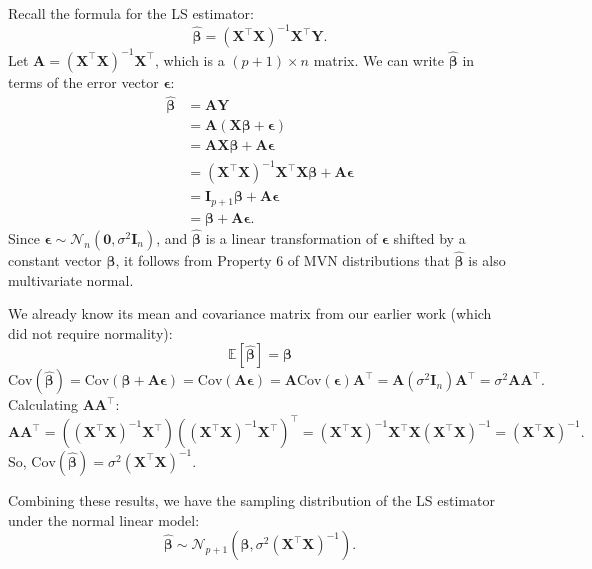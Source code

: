 \documentclass[11pt, letterpaper]{article}
\theoremstyle{plain} %
\theoremstyle{definition} %
\theoremstyle{remark} %
\renewcommand{\mathbf}{\boldsymbol} %
\newcommand{\E}{\mathbb{E}}
\newcommand{\Cov}{\mathrm{Cov}} %
\newcommand{\Normal}{\mathcal{N}}
\newcommand{\I}{\mathbf{I}} %
\begin{document}
Recall the formula for the LS estimator:
\[
\hat{\boldsymbol{\beta}} = (\boldsymbol{X}^{\top}\boldsymbol{X})^{-1} \boldsymbol{X}^{\top} \boldsymbol{Y}.
\]
Let $\boldsymbol{A} = (\boldsymbol{X}^{\top}\boldsymbol{X})^{-1} \boldsymbol{X}^{\top}$, which is a $(p+1) \times n$ matrix. We can write $\hat{\boldsymbol{\beta}}$ in terms of the error vector $\boldsymbol{\epsilon}$:
\begin{align*}
\hat{\boldsymbol{\beta}} &= \boldsymbol{A} \boldsymbol{Y} \\
&= \boldsymbol{A} (\boldsymbol{X}\boldsymbol{\beta} + \boldsymbol{\epsilon}) \\
&= \boldsymbol{A}\boldsymbol{X}\boldsymbol{\beta} + \boldsymbol{A}\boldsymbol{\epsilon} \\
&= (\boldsymbol{X}^{\top}\boldsymbol{X})^{-1} \boldsymbol{X}^{\top} \boldsymbol{X} \boldsymbol{\beta} + \boldsymbol{A}\boldsymbol{\epsilon} \\
&= \I_{p+1} \boldsymbol{\beta} + \boldsymbol{A}\boldsymbol{\epsilon} \\
&= \boldsymbol{\beta} + \boldsymbol{A}\boldsymbol{\epsilon}.
\end{align*}
Since $\boldsymbol{\epsilon} \sim \Normal_n(\mathbf{0}, \sigma^2 \I_n)$, and $\hat{\boldsymbol{\beta}}$ is a linear transformation of $\boldsymbol{\epsilon}$ shifted by a constant vector $\boldsymbol{\beta}$, it follows from Property 6 of MVN distributions that $\hat{\boldsymbol{\beta}}$ is also multivariate normal.

We already know its mean and covariance matrix from our earlier work (which did not require normality):
\[
\E[\hat{\boldsymbol{\beta}}] = \boldsymbol{\beta}
\]
\[
\Cov(\hat{\boldsymbol{\beta}}) = \Cov(\boldsymbol{\beta} + \boldsymbol{A}\boldsymbol{\epsilon}) = \Cov(\boldsymbol{A}\boldsymbol{\epsilon}) = \boldsymbol{A} \Cov(\boldsymbol{\epsilon}) \boldsymbol{A}^{\top} = \boldsymbol{A} (\sigma^2 \I_n) \boldsymbol{A}^{\top} = \sigma^2 \boldsymbol{A}\boldsymbol{A}^{\top}.
\]
Calculating $\boldsymbol{A}\boldsymbol{A}^{\top}$:
\[
\boldsymbol{A}\boldsymbol{A}^{\top} = \left( (\boldsymbol{X}^{\top}\boldsymbol{X})^{-1} \boldsymbol{X}^{\top} \right) \left( (\boldsymbol{X}^{\top}\boldsymbol{X})^{-1} \boldsymbol{X}^{\top} \right)^{\top} = (\boldsymbol{X}^{\top}\boldsymbol{X})^{-1} \boldsymbol{X}^{\top} \boldsymbol{X} (\boldsymbol{X}^{\top}\boldsymbol{X})^{-1} = (\boldsymbol{X}^{\top}\boldsymbol{X})^{-1}.
\]
So, $\Cov(\hat{\boldsymbol{\beta}}) = \sigma^2 (\boldsymbol{X}^{\top}\boldsymbol{X})^{-1}$.

Combining these results, we have the sampling distribution of the LS estimator under the normal linear model:
\begin{equation} \label{eq:dist_beta_hat}
\hat{\boldsymbol{\beta}} \sim \Normal_{p+1} \left( \boldsymbol{\beta}, \sigma^2 (\boldsymbol{X}^{\top}\boldsymbol{X})^{-1} \right).
\end{equation}
\end{document}
